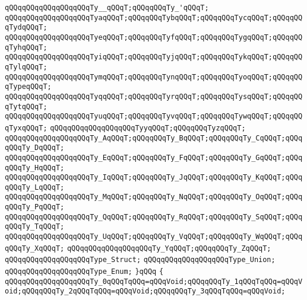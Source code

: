 \newline
\verb|qQQqqQQqqQQqqQQqqQQqTy__qQQqT;qQQqqQQqTy_'qQQqT;|\newline
\newline
\verb|qQQqqQQqqQQqqQQqqQQqTyaqQQqT;qQQqqQQqTybqQQqT;qQQqqQQqTycqQQqT;qQQqqQQqTydqQQqT;|\newline
\verb|qQQqqQQqqQQqqQQqqQQqTyeqQQqT;qQQqqQQqTyfqQQqT;qQQqqQQqTygqQQqT;qQQqqQQqTyhqQQqT;|\newline
\verb|qQQqqQQqqQQqqQQqqQQqTyiqQQqT;qQQqqQQqTyjqQQqT;qQQqqQQqTykqQQqT;qQQqqQQqTylqQQqT;|\newline
\verb|qQQqqQQqqQQqqQQqqQQqTymqQQqT;qQQqqQQqTynqQQqT;qQQqqQQqTyoqQQqT;qQQqqQQqTypeqQQqT;|\newline
\verb|qQQqqQQqqQQqqQQqqQQqTyqqQQqT;qQQqqQQqTyrqQQqT;qQQqqQQqTysqQQqT;qQQqqQQqTytqQQqT;|\newline
\verb|qQQqqQQqqQQqqQQqqQQqTyuqQQqT;qQQqqQQqTyvqQQqT;qQQqqQQqTywqQQqT;qQQqqQQqTyxqQQqT;|\newline
\verb|qQQqqQQqqQQqqQQqqQQqTyyqQQqT;qQQqqQQqTyzqQQqT;|\newline
\newline
\verb|qQQqqQQqqQQqqQQqqQQqTy_AqQQqT;qQQqqQQqTy_BqQQqT;qQQqqQQqTy_CqQQqT;qQQqqQQqTy_DqQQqT;|\newline
\verb|qQQqqQQqqQQqqQQqqQQqTy_EqQQqT;qQQqqQQqTy_FqQQqT;qQQqqQQqTy_GqQQqT;qQQqqQQqTy_HqQQqT;|\newline
\verb|qQQqqQQqqQQqqQQqqQQqTy_IqQQqT;qQQqqQQqTy_JqQQqT;qQQqqQQqTy_KqQQqT;qQQqqQQqTy_LqQQqT;|\newline
\verb|qQQqqQQqqQQqqQQqqQQqTy_MqQQqT;qQQqqQQqTy_NqQQqT;qQQqqQQqTy_OqQQqT;qQQqqQQqTy_PqQQqT;|\newline
\verb|qQQqqQQqqQQqqQQqqQQqTy_QqQQqT;qQQqqQQqTy_RqQQqT;qQQqqQQqTy_SqQQqT;qQQqqQQqTy_TqQQqT;|\newline
\verb|qQQqqQQqqQQqqQQqqQQqTy_UqQQqT;qQQqqQQqTy_VqQQqT;qQQqqQQqTy_WqQQqT;qQQqqQQqTy_XqQQqT;|\newline
\verb|qQQqqQQqqQQqqQQqqQQqTy_YqQQqT;qQQqqQQqTy_ZqQQqT;|\newline
\newline
\verb|qQQqqQQqqQQqqQQqqQQqType_Struct;|\newline
\verb|qQQqqQQqqQQqqQQqqQQqType_Union;|\newline
\verb|qQQqqQQqqQQqqQQqqQQqType_Enum;|\newline
\newline
\verb|}qQQq|\newline
\verb|{|\newline
\verb|qQQqqQQqqQQqqQQqqQQqTy_0qQQqTqQQq=qQQqVoid;qQQqqQQqTy_1qQQqTqQQq=qQQqVoid;qQQqqQQqTy_2qQQqTqQQq=qQQqVoid;qQQqqQQqTy_3qQQqTqQQq=qQQqVoid;|\newline
